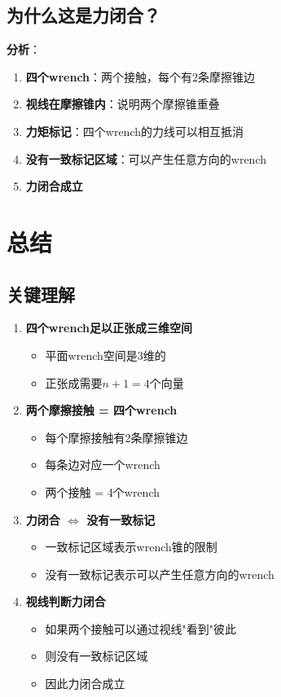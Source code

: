 \documentclass[12pt,a4paper]{article}
\begin{document}
\subsection{为什么这是力闭合？}

\textbf{分析}：
\begin{enumerate}
\item \textbf{四个wrench}：两个接触，每个有2条摩擦锥边
\item \textbf{视线在摩擦锥内}：说明两个摩擦锥重叠
\item \textbf{力矩标记}：四个wrench的力线可以相互抵消
\item \textbf{没有一致标记区域}：可以产生任意方向的wrench
\item \textbf{力闭合成立}
\end{enumerate}

\section{总结}

\subsection{关键理解}

\begin{enumerate}
\item \textbf{四个wrench足以正张成三维空间}
   \begin{itemize}
   \item 平面wrench空间是3维的
   \item 正张成需要$n+1 = 4$个向量
   \end{itemize}

\item \textbf{两个摩擦接触 = 四个wrench}
   \begin{itemize}
   \item 每个摩擦接触有2条摩擦锥边
   \item 每条边对应一个wrench
   \item 两个接触 = 4个wrench
   \end{itemize}

\item \textbf{力闭合 $\Leftrightarrow$ 没有一致标记}
   \begin{itemize}
   \item 一致标记区域表示wrench锥的限制
   \item 没有一致标记表示可以产生任意方向的wrench
   \end{itemize}

\item \textbf{视线判断力闭合}
   \begin{itemize}
   \item 如果两个接触可以通过视线"看到"彼此
   \item 则没有一致标记区域
   \item 因此力闭合成立
   \end{itemize}
\end{enumerate}
\end{document}
